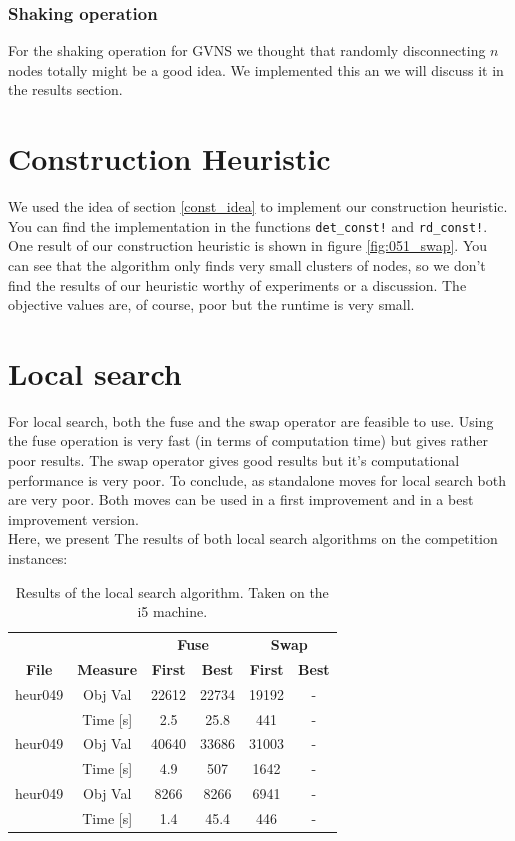 \subsubsection{Shaking operation}
For the shaking operation for GVNS we thought that randomly disconnecting $n$ nodes totally might be a good idea. We implemented this an we will discuss it in the results section.\\

\section{Construction Heuristic}

We used the idea of section \ref{const_idea} to implement our construction heuristic. You can find the implementation in the functions \texttt{det\_const!} and \texttt{rd\_const!}. One result of our construction heuristic is shown in figure \ref{fig:051_swap}. You can see that the algorithm only finds very small clusters of nodes, so we don't find the results of our heuristic worthy of experiments or a discussion. The objective values are, of course, poor but the runtime is very small.\\

\section{Local search}

For local search, both the fuse and the swap operator are feasible to use. Using the fuse operation is very fast (in terms of computation time) but gives rather poor results. The swap operator gives good results but it's computational performance is very poor. To conclude, as standalone moves for local search both are very poor. Both moves can be used in a first improvement and in a best improvement version.\\
Here, we present The results of both local search algorithms on the competition instances:\\


\begin{table}[h]
    \centering
    \begin{tabular}{cccccc}
        \hline
         & & \multicolumn{2}{c}{\textbf{Fuse}} & \multicolumn{2}{c}{\textbf{Swap}} \\
         \textbf{File} & \textbf{Measure} & \textbf{First} & \textbf{Best} & \textbf{First} & \textbf{Best} \\
        \hline
        heur049 & Obj Val & 22612 & 22734 & 19192 & - \\
                & Time [s] & 2.5 & 25.8 & 441 & -\\
        heur049 & Obj Val & 40640 & 33686 & 31003 & - \\
                 & Time [s] & 4.9 & 507 & 1642 & -\\
        heur049 & Obj Val & 8266 & 8266 & 6941 & - \\
                & Time [s] & 1.4 & 45.4 & 446 & -\\
        \hline
    \end{tabular}
    \caption{Results of the local search algorithm. Taken on the i5 machine.}
    \label{tab:mytable}
\end{table}

